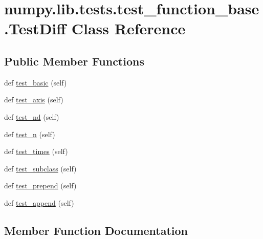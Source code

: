 \hypertarget{classnumpy_1_1lib_1_1tests_1_1test__function__base_1_1TestDiff}{}\section{numpy.\+lib.\+tests.\+test\+\_\+function\+\_\+base.\+Test\+Diff Class Reference}
\label{classnumpy_1_1lib_1_1tests_1_1test__function__base_1_1TestDiff}
\subsection*{Public Member Functions}
\begin{DoxyCompactItemize}
\item 
def \hyperlink{classnumpy_1_1lib_1_1tests_1_1test__function__base_1_1TestDiff_aff9d070f1dc08e768ce962a261f954e9}{test\+\_\+basic} (self)
\item 
def \hyperlink{classnumpy_1_1lib_1_1tests_1_1test__function__base_1_1TestDiff_ab6b237ab344eb4752c0fe6d5aa289ea7}{test\+\_\+axis} (self)
\item 
def \hyperlink{classnumpy_1_1lib_1_1tests_1_1test__function__base_1_1TestDiff_a8ddc8c6843298b7ec869b90e730ed170}{test\+\_\+nd} (self)
\item 
def \hyperlink{classnumpy_1_1lib_1_1tests_1_1test__function__base_1_1TestDiff_aaf7729c802d0347af3de07e803c4c3bb}{test\+\_\+n} (self)
\item 
def \hyperlink{classnumpy_1_1lib_1_1tests_1_1test__function__base_1_1TestDiff_acbad0a8c492700911a16c282b9329389}{test\+\_\+times} (self)
\item 
def \hyperlink{classnumpy_1_1lib_1_1tests_1_1test__function__base_1_1TestDiff_ac9b633134ca847a328ade5e7ef01a31e}{test\+\_\+subclass} (self)
\item 
def \hyperlink{classnumpy_1_1lib_1_1tests_1_1test__function__base_1_1TestDiff_a9a616d028effd61a413ada66c47566f2}{test\+\_\+prepend} (self)
\item 
def \hyperlink{classnumpy_1_1lib_1_1tests_1_1test__function__base_1_1TestDiff_a3154adba38645dc154a9acfca52114b0}{test\+\_\+append} (self)
\end{DoxyCompactItemize}


\subsection{Member Function Documentation}
\mbox{\label{classnumpy_1_1lib_1_1tests_1_1test__function__base_1_1TestDiff_a3154adba38645dc154a9acfca52114b0}} 

